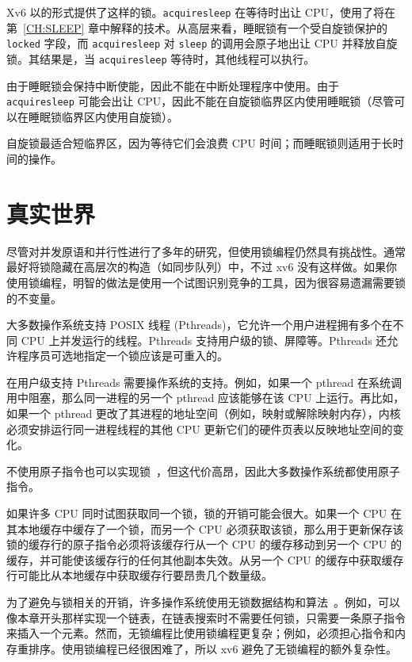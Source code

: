Xv6 以的形式提供了这样的锁。\lstinline{acquiresleep}  在等待时出让 CPU，使用了将在第~\ref{CH:SLEEP} 章中解释的技术。从高层来看，睡眠锁有一个受自旋锁保护的 \lstinline{locked} 字段，而 \lstinline{acquiresleep} 对 \lstinline{sleep} 的调用会原子地出让 CPU 并释放自旋锁。其结果是，当 \lstinline{acquiresleep} 等待时，其他线程可以执行。

由于睡眠锁会保持中断使能，因此不能在中断处理程序中使用。由于 \lstinline{acquiresleep} 可能会出让 CPU，因此不能在自旋锁临界区内使用睡眠锁（尽管可以在睡眠锁临界区内使用自旋锁）。

自旋锁最适合短临界区，因为等待它们会浪费 CPU 时间；而睡眠锁则适用于长时间的操作。

\section{真实世界}
尽管对并发原语和并行性进行了多年的研究，但使用锁编程仍然具有挑战性。通常最好将锁隐藏在高层次的构造（如同步队列）中，不过 xv6 没有这样做。如果你使用锁编程，明智的做法是使用一个试图识别竞争的工具，因为很容易遗漏需要锁的不变量。

大多数操作系统支持 POSIX 线程 (Pthreads)，它允许一个用户进程拥有多个在不同 CPU 上并发运行的线程。Pthreads 支持用户级的锁、屏障等。Pthreads 还允许程序员可选地指定一个锁应该是可重入的。

在用户级支持 Pthreads 需要操作系统的支持。例如，如果一个 pthread 在系统调用中阻塞，那么同一进程的另一个 pthread 应该能够在该 CPU 上运行。再比如，如果一个 pthread 更改了其进程的地址空间（例如，映射或解除映射内存），内核必须安排运行同一进程线程的其他 CPU 更新它们的硬件页表以反映地址空间的变化。

不使用原子指令也可以实现锁~\cite{lamport:bakery}，但这代价高昂，因此大多数操作系统都使用原子指令。

如果许多 CPU 同时试图获取同一个锁，锁的开销可能会很大。如果一个 CPU 在其本地缓存中缓存了一个锁，而另一个 CPU 必须获取该锁，那么用于更新保存该锁的缓存行的原子指令必须将该缓存行从一个 CPU 的缓存移动到另一个 CPU 的缓存，并可能使该缓存行的任何其他副本失效。从另一个 CPU 的缓存中获取缓存行可能比从本地缓存中获取缓存行要昂贵几个数量级。

为了避免与锁相关的开销，许多操作系统使用无锁数据结构和算法~\cite{herlihy:art,mckenney:rcuusage}。例如，可以像本章开头那样实现一个链表，在链表搜索时不需要任何锁，只需要一条原子指令来插入一个元素。然而，无锁编程比使用锁编程更复杂；例如，必须担心指令和内存重排序。使用锁编程已经很困难了，所以 xv6 避免了无锁编程的额外复杂性。

